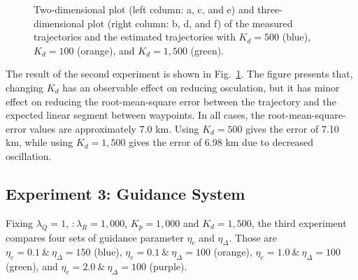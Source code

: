 \begin{figure}[h]
	\caption{Two-dimensional plot (left column: a, c, and e) and three-dimensional plot (right column: b, d, and f) of the measured trajectories and the estimated trajectories with $K_d=500$ (blue), $K_d=100$ (orange), and $K_d=1,500$ (green).}
	\label{fig:exp_Dgain}
\end{figure}

 The result of the second experiment is shown in Fig.~\ref{fig:exp_Dgain}. The figure presents that, changing $K_d$ has an observable effect on reducing osculation, but it has minor effect on reducing the root-mean-square error between the trajectory and the expected linear segment between waypoints. In all cases, the root-mean-square-error values are approximately 7.0 km. Using $K_d=500$ gives the error of 7.10 km, while using $K_d=1,500$ gives the error of 6.98 km due to decreased oscillation.

\subsection{Experiment 3: Guidance System}
\label{sec:exp_guidance}

Fixing $\lambda_Q=1$, $:\lambda_R=1,000$, $K_p=1,000$ and $K_d=1,500$, the third experiment compares four sets of guidance parameter $\eta_e$ and $\eta_\Delta$. Those are $\eta_e=0.1\:\&\:\eta_\Delta=150$ (blue), $\eta_e=0.1\:\&\:\eta_\Delta=100$ (orange), $\eta_e=1.0\:\&\:\eta_\Delta=100$ (green), and $\eta_e=2.0\:\&\:\eta_\Delta=100$ (purple).



